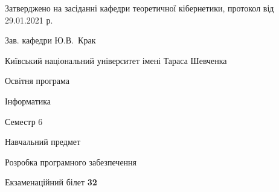 \documentclass[10pt, ukrainian]{article}
\begin{document}
{\vspace{5mm}\smallskip \begin {small} Затверджено на засіданні кафедри теоретичної кібернетики, протокол  від   29.01.2021 р.\par\smallskip\smallskip
{\parbox {6.5 cm}{Зав. кафедри \dotfill Ю.В.~Крак}} \end{small}}
\newpage

{{\begin {small}\par
{ \center  Київський національний університет імені Тараса Шевченка \par}
{\parbox {5 cm}{Освітня програма \hfill}{\parbox {7 cm}{Інформатика \hfill}}\parbox {6 cm}{\hfill Семестр 6}}\par
{\parbox {5 cm} {Навчальний предмет \hfill}\parbox {7 cm}{Розробка програмного забезпечення \hfill}\parbox {6cm}{\hfill}\par}\vspace{-7pt} \end{small}}{\center Екзаменаційний білет \No \textbf
{ 32 }\par}}
\end{document}
